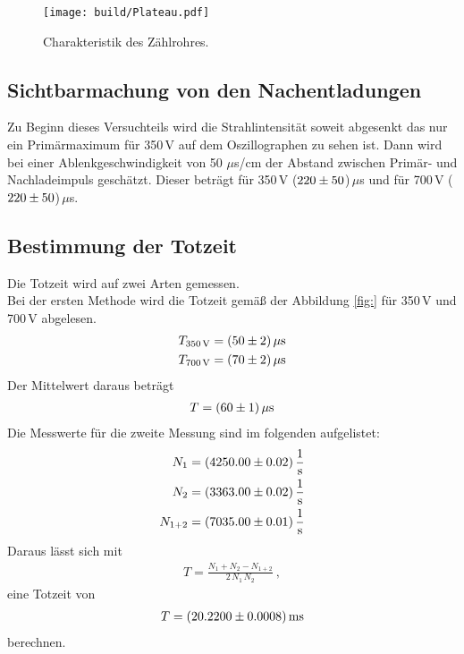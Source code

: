 \begin{figure}[H]
  \centering
  \texttt{[image: build/Plateau.pdf]}
  \caption{Charakteristik des Zählrohres.}
  \label{fig:Char1}
\end{figure}


\subsection{Sichtbarmachung von den Nachentladungen}
Zu Beginn dieses Versuchteils wird die Strahlintensität soweit abgesenkt das nur ein Primärmaximum für 350\,V auf dem Oszillographen zu sehen ist. Dann wird bei einer Ablenkgeschwindigkeit von 50 $\mu$s/cm der Abstand zwischen Primär- und Nachladeimpuls geschätzt. Dieser beträgt für 350\,V ($\num{220 +- 50}$)\,$\mu$s und für 700\,V ($\num{220 +- 50}$)\,$\mu$s.


\subsection{Bestimmung der Totzeit}
Die Totzeit wird auf zwei Arten gemessen. \\
Bei der ersten Methode wird die Totzeit gemäß der Abbildung \eqref{fig:} für 350\,V und 700\,V abgelesen.
\begin{align*}
  T_\text{350\,V} = (\num{50 +- 2})\,\mu\text{s} \\
  T_\text{700\,V} = (\num{70 +- 2})\,\mu\text{s} \\
\end{align*}
Der Mittelwert daraus beträgt
\begin{align*}
  T = (\num{60 +- 1})\,\mu\text{s}
\end{align*}
Die Messwerte für die zweite Messung sind im folgenden aufgelistet:
\begin{align*}
  N_1 = (\num{4250.00 +- 0.02})\,\frac{1}{\text{s}} \\
  N_2 = (\num{3363.00 +- 0.02})\,\frac{1}{\text{s}} \\
  N_{1+2} = (\num{7035.00 +- 0.01})\,\frac{1}{\text{s}} \\
\end{align*}
Daraus lässt sich mit
\begin{align*}
  T = \frac{N_1 + N_2 - N_{1+2}}{2\,N_1\,N_2} \ ,
\end{align*}
eine Totzeit von
\begin{align*}
  T = (\num{20.2200 +- 0.0008})\,\text{ms}
\end{align*}
berechnen.

























\subsection{}

